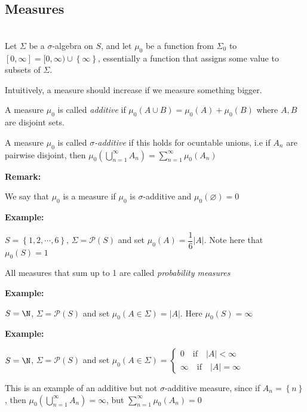 \subsection{Measures}\hfill\\
\noindent Let $\Sigma$ be a $\sigma$-algebra on $S$, and let $\mu_0$ be a function from $\Sigma_0$ to $[0,\infty] = [0,\infty)\cup\left\{\infty\right\}$, essentially a function that assigns some value to subsets of $\Sigma$.\par
\noindent Intuitively, a measure should increase if we measure something bigger.
\par\bigskip
\begin{defo}{}
  A measure $\mu_0$ is called \textit{additive} if $\mu_0(A\cup B) = \mu_0(A)+\mu_0(B)$ where $A, B$ are disjoint sets.
  \par\bigskip
  \noindent A measure $\mu_0$ is called \textit{$\sigma$-additive} if this holds for ocuntable unions, i.e if $A_n$ are pairwise disjoint, then $\mu_0\left(\bigcup_{n=1}^{\infty}A_n\right) = \sum_{n=1}^{\infty}\mu_0(A_n)$
\end{defo}
\par\bigskip
\noindent\textbf{Remark:}\par
\noindent We say that $\mu_0$ is a measure if $\mu_0$ is $\sigma$-additive and $\mu_0(\varnothing) =0$
\par\bigskip
\noindent\textbf{Example:}\par
\noindent $S = \left\{1,2,\cdots, 6\right\}$, $\Sigma = \mathcal{P}(S)$ and set $\mu_0(A) = \dfrac{1}{6}\left|A\right|$. Note here that $\mu_0(S) = 1$
\par\bigskip
\begin{defo}{}
  All measures that sum up to 1 are called \textit{probability measures}
\end{defo}
\par\bigskip
\noindent\textbf{Example:}\par
\noindent $S = \N$, $\Sigma = \mathcal{P}(S)$ and set $\mu_0(A\in\Sigma) = \left|A\right|$. Here $\mu_0(S) = \infty$
\par\bigskip
\noindent\textbf{Example:}\par
\noindent $S = \N$, $\Sigma = \mathcal{P}(S)$ and set $\mu_0(A\in\Sigma) = \begin{cases*}0\quad\text{if}\quad \left|A\right|<\infty\\\infty\quad\text{if}\quad \left|A\right| = \infty\end{cases*}$\par
\noindent This is an example of an additive but not $\sigma$-additive measure, since if $A_n = \left\{n\right\}$, then $\mu_0\left(\bigcup_{n=1}^{\infty}A_n\right) = \infty$, but $\sum_{n=1}^{\infty}\mu_0(A_n) = 0$
\par\bigskip
